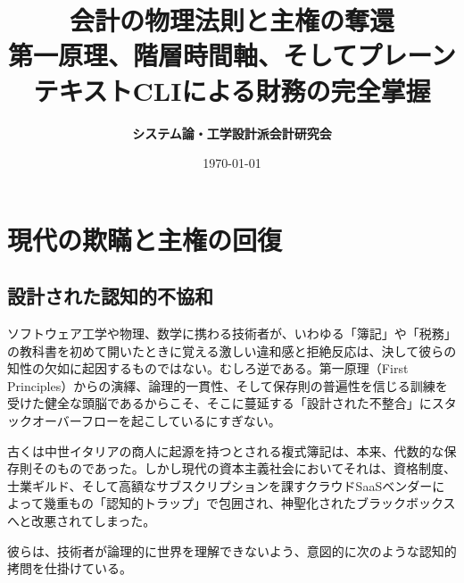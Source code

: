 \documentclass[11pt, a4paper]{report}
\begin{document}
\title{\Huge \textbf{会計の物理法則と主権の奪還}\\[4mm]
\Large 第一原理、階層時間軸、そしてプレーンテキストCLIによる財務の完全掌握}
\author{\textbf{システム論・工学設計派会計研究会}}
\date{\today}
\maketitle
\tableofcontents
\newpage

\chapter{現代の欺瞞と主権の回復}
\label{chap:introduction}

\section{設計された認知的不協和}

ソフトウェア工学や物理、数学に携わる技術者が、いわゆる「簿記」や「税務」の教科書を初めて開いたときに覚える激しい違和感と拒絶反応は、決して彼らの知性の欠如に起因するものではない。むしろ逆である。第一原理（First Principles）からの演繹、論理的一貫性、そして保存則の普遍性を信じる訓練を受けた健全な頭脳であるからこそ、そこに蔓延する「設計された不整合」にスタックオーバーフローを起こしているにすぎない。

古くは中世イタリアの商人に起源を持つとされる複式簿記は、本来、代数的な保存則そのものであった。しかし現代の資本主義社会においてそれは、資格制度、士業ギルド、そして高額なサブスクリプションを課すクラウドSaaSベンダーによって幾重もの「認知的トラップ」で包囲され、神聖化されたブラックボックスへと改悪されてしまった。

彼らは、技術者が論理的に世界を理解できないよう、意図的に次のような認知的拷問を仕掛けている。
\end{document}
